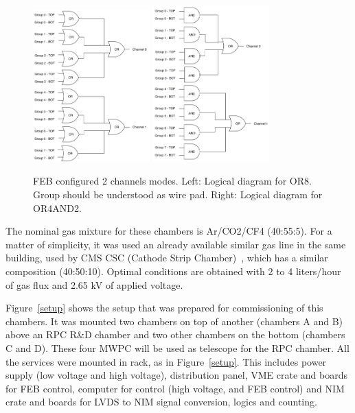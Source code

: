 \begin{figure}[!htbp]
\begin{center}
\includegraphics[width=0.40\textwidth,keepaspectratio]{figures_and_tables/rpc/mwpc/or8.png}\hspace*{1.cm}
\includegraphics[width=0.40\textwidth,keepaspectratio]{figures_and_tables/rpc/mwpc/or4and2.png}\hspace*{1.cm}
\end{center}\vspace*{-.5cm}
\caption{FEB configured 2 channels modes. Left: Logical diagram for OR8. Group should be understood as wire pad. Right: Logical diagram for OR4AND2.}
\label{2channels}
\end{figure}

The nominal gas mixture for these chambers is Ar/CO2/CF4 (40:55:5). For a matter of simplicity, it was used an already available similar gas line in the same building, used by CMS CSC (Cathode Strip Chamber)~\cite{muon_tdr}, which has a similar composition (40:50:10). Optimal conditions are obtained with 2 to 4 liters/hour of gas flux and 2.65 kV of applied voltage.

Figure~\ref{setup} shows the setup that was prepared for commissioning of this chambers. It was mounted two chambers on top of another (chambers A and B) above an RPC R\&D chamber and two other chambers on the bottom (chambers C and D). These four MWPC will be used as telescope for the RPC chamber. All the services were mounted in rack, as in Figure~\ref{setup}. This includes power supply (low voltage and high voltage), distribution panel, VME crate and boards for FEB control, computer for control (high voltage, and FEB control) and NIM crate and boards for LVDS to NIM signal conversion, logics and counting.

